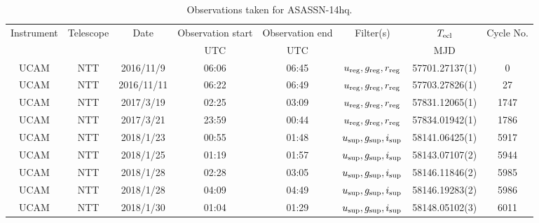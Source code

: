 \begin{table}
	\begin{center}
		\caption{Observations taken for ASASSN-14hq.}
		\label{table:observing:observation logs ASASSN-14hq}
		\begin{tabular}{cccccccc}
			\hline
			Instrument & Telescope & Date & Observation start & Observation end & Filter(s) & $T_{\rm ecl}$ & Cycle No. \\
			 &  &  & UTC & UTC &  & MJD &  \\
			\hline
			\hline
			 UCAM & NTT & 2016/11/9  & 06:06 & 06:45 & $u_{\rm reg},g_{\rm reg},r_{\rm reg}$ & 57701.27137(1)                                                                                                            &                                           0 \\
			 UCAM & NTT & 2016/11/11 & 06:22 & 06:49 & $u_{\rm reg},g_{\rm reg},r_{\rm reg}$ & 57703.27826(1)                                                                                                            &                                          27 \\
			 UCAM & NTT & 2017/3/19  & 02:25 & 03:09 & $u_{\rm reg},g_{\rm reg},r_{\rm reg}$ & 57831.12065(1)                                                                                                            &                                        1747 \\
			 UCAM & NTT & 2017/3/21  & 23:59 & 00:44 & $u_{\rm reg},g_{\rm reg},r_{\rm reg}$ & 57834.01942(1)                                                                                                            &                                        1786 \\
			 UCAM & NTT & 2018/1/23  & 00:55 & 01:48 & $u_{\rm sup},g_{\rm sup},i_{\rm sup}$ & 58141.06425(1)                                                                                                            &                                        5917 \\
			 UCAM & NTT & 2018/1/25  & 01:19 & 01:57 & $u_{\rm sup},g_{\rm sup},i_{\rm sup}$ & 58143.07107(2)                                                                                                            &                                        5944 \\
			 UCAM & NTT & 2018/1/28  & 02:28 & 03:05 & $u_{\rm sup},g_{\rm sup},i_{\rm sup}$ & 58146.11846(2)                                                                                                            &                                        5985 \\
			 UCAM & NTT & 2018/1/28  & 04:09 & 04:49 & $u_{\rm sup},g_{\rm sup},i_{\rm sup}$ & 58146.19283(2)                                                                                                            &                                        5986 \\
			 UCAM & NTT & 2018/1/30  & 01:04 & 01:29 & $u_{\rm sup},g_{\rm sup},i_{\rm sup}$ & 58148.05102(3)                                                                                                            &                                        6011 \\
			\hline
			\end{tabular}
	\end{center}
\end{table}
